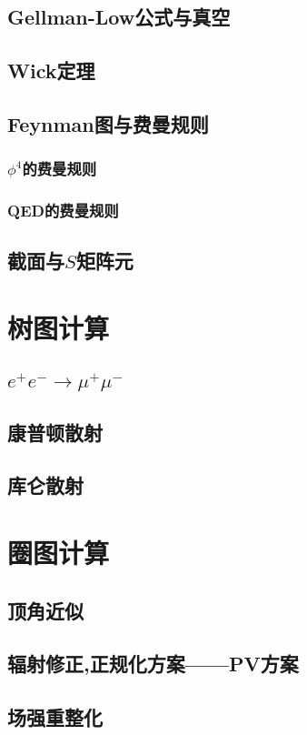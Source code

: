 \documentclass{book}
\begin{document}
\section{Gellman-Low公式与真空}
\section{Wick定理}
\section{Feynman图与费曼规则}
\subsection{$\phi^4$的费曼规则}
\subsection{QED的费曼规则}
\section{截面与$S$矩阵元}
\chapter{树图计算}
\section{$e^+e^-\rightarrow\mu^+\mu^-$}
\section{康普顿散射}
\section{库仑散射}
\chapter{圈图计算}
\section{顶角近似}
\section{辐射修正,正规化方案——PV方案}
\section{场强重整化}
\end{document}
